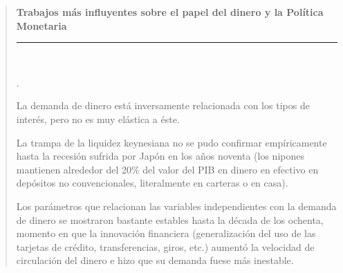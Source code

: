 \documentclass[10pt,a4paper]{article}
\newcounter{numitem}
\newenvironment{lnum}
      {\begin{list}{\arabic{numitem}.}{%
          \usecounter{numitem}%
          \setlength{\leftmargin}{1cm}%
          \setlength{\parskip}{3pt}%
          \setlength{\itemsep}{0pt}%
          \setlength{\parsep}{0pt}%
      }}
      {\end{list}}
\newenvironment{specialblock}[1]{%
      \begin{quote} %
      \small %
      \noindent\textbf{#1}\\[-0.3em] %
      \rule{\linewidth}{0.4pt}\\[0.6em]}{
      \end{quote}}
\begin{document}
\begin{specialblock}{Trabajos más influyentes sobre el papel del dinero y la Política Monetaria}
\begin{lnum}
        \item La demanda de dinero está inversamente relacionada con los tipos de interés, pero no es muy elástica a éste.
        \item La trampa de la liquidez keynesiana no se pudo confirmar empíricamente hasta la recesión sufrida por Japón en los años noventa (los nipones mantienen alrededor del 20\% del valor del PIB en dinero en efectivo en depósitos no convencionales, literalmente en carteras o en casa).
        \item Los parámetros que relacionan las variables independientes con la demanda de dinero se mostraron bastante estables hasta la década de los ochenta, momento en que la innovación financiera (generalización del uso de las tarjetas de crédito, transferencias, giros, etc.) aumentó la velocidad de circulación del dinero e hizo que su demanda fuese más inestable.
    \end{lnum}
\end{specialblock}
\end{document}
